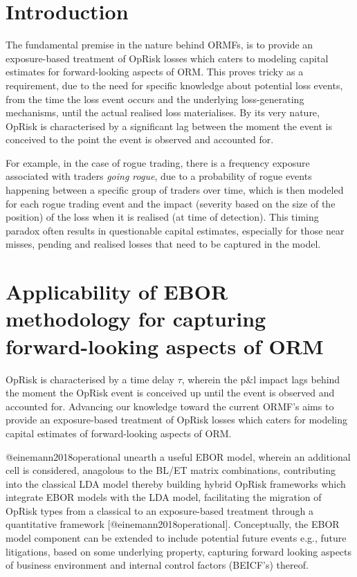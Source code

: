 \documentclass[]{article}
\title{}
\author{}
\date{}
\begin{document}
\doublespacing

\section{Introduction}
\label{sec3:Introduction}

The fundamental premise in the nature behind ORMFs, is to provide an
exposure-based treatment of OpRisk losses which caters to modeling
capital estimates for forward-looking aspects of ORM. This proves tricky
as a requirement, due to the need for specific knowledge about potential
loss events, from the time the loss event occurs and the underlying
loss-generating mechanisms, until the actual realised loss materialises.
By its very nature, OpRisk is characterised by a significant lag between
the moment the event is conceived to the point the event is observed and
accounted for.\medskip 

For example, in the case of rogue trading, there is a frequency exposure
associated with traders \emph{going rogue}, due to a probability of
rogue events happening between a specific group of traders over time,
which is then modeled for each rogue trading event and the impact
(severity based on the size of the position) of the loss when it is
realised (at time of detection). This timing paradox often results in
questionable capital estimates, especially for those near misses,
pending and realised losses that need to be captured in the model.

\section{Applicability of EBOR methodology for capturing forward-looking aspects of ORM}
\label{sec:Applicability of EBOR methodology for capturing forward-looking aspects of ORM}

OpRisk is characterised by a time delay \(\tau\), wherein the p\&l
impact lags behind the moment the OpRisk event is conceived up until the
event is observed and accounted for. Advancing our knowledge toward the
current ORMF's aims to provide an exposure-based treatment of OpRisk
losses which caters for modeling capital estimates of forward-looking
aspects of ORM.\medskip

@einemann2018operational unearth a useful EBOR model, wherein an
additional cell is considered, anagolous to the BL/ET matrix
combinations, contributing into the classical LDA model thereby building
hybrid OpRisk frameworks which integrate EBOR models with the LDA model,
facilitating the migration of OpRisk types from a classical to an
exposure-based treatment through a quantitative framework
{[}@einemann2018operational{]}. Conceptually, the EBOR model component
can be extended to include potential future events e.g., future
litigations, based on some underlying property, capturing forward
looking aspects of business environment and internal control factors
(BEICF's) thereof.\medskip
\end{document}

